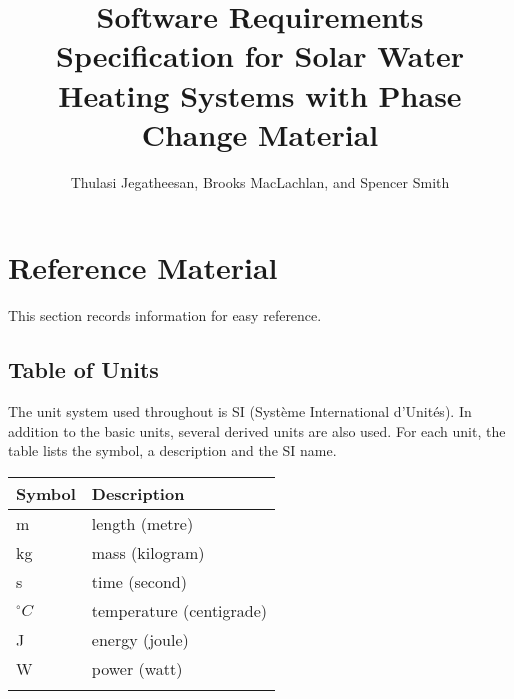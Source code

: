 \documentclass[12pt]{article}
\title{Software Requirements Specification for Solar Water Heating Systems with Phase Change Material}
\author{Thulasi Jegatheesan, Brooks MacLachlan, and Spencer Smith}
\begin{document}
\maketitle
\tableofcontents
\newpage
\section{Reference Material}
\label{Sec:RM}
This section records information for easy reference.
\subsection{Table of Units}
\label{Sec:ToU}
The unit system used throughout is SI (Syst\`{e}me International d'Unit\'{e}s). In addition to the basic units, several derived units are also used. For each unit, the table lists the symbol, a description and the SI name.
\begin{longtable*}{l l}
\toprule
Symbol & Description
\\
\midrule
m & length (metre)
\\
kg & mass (kilogram)
\\
s & time (second)
\\
${}^{\circ}C$ & temperature (centigrade)
\\
J & energy (joule)
\\
W & power (watt)
\\
\bottomrule
\label{Table:ToU}
\end{longtable*}
\end{document}
